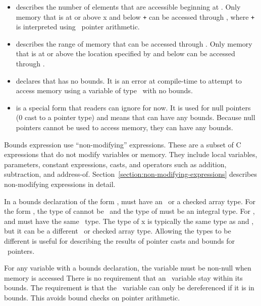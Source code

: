 \begin{itemize}
\item
   describes the number of
  elements that are accessible beginning at . Only memory that
  is at or above x and below  \texttt{+}  can be
  accessed through , where  \texttt{+}  is
  interpreted using \arrayptr\ pointer arithmetic.
\item
  describes the range of memory that can be accessed through .
  Only memory that is at or above the location specified by 
  and below  can be accessed through .
\item
   declares that  has no bounds.
  It is an error at compile-time to attempt to access memory using a
  variable of type \arrayptr\ with no bounds.
\item
   is a special form that readers can
  ignore for now. It is used for null pointers (0 cast to a pointer
  type) and means that  can have any bounds. Because null
  pointers cannot be used to access memory, they can have any bounds.
\end{itemize}

Bounds expression use ``non-modifying'' expressions. These are a subset
of C expressions that do not modify variables or memory. They include
local variables, parameters, constant expressions, casts, and operators
such as addition, subtraction, and address-of. 
Section~\ref{section:non-modifying-expressions}  describes
non-modifying expressions in detail.

In a bounds declaration of the form ,
 must have an \arrayptr\ or a checked array type. 
For the form  ,  the type of 
 cannot be \arrayptrvoid\ and the type of  must be an integral type. 
For ,  and
 must have the same \arrayptr\ type. The type of x is
typically the same type as  and , but it can be a
different \arrayptr\ or checked array type. Allowing the types
to be different is useful for describing the results of pointer casts and
bounds for \arrayptrvoid\ pointers.

For any variable with a bounds declaration, the variable must be
non-null when memory is accessed There is no requirement that an
\arrayptr\ variable stay within its bounds. The requirement is
that the \arrayptr\ variable can only be dereferenced if it is
in bounds. This avoids bound checks on pointer arithmetic.

